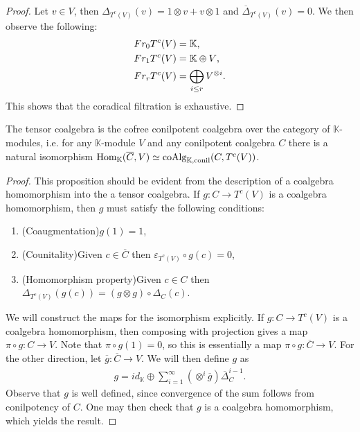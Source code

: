 \documentclass[../thesis.tex]{subfiles}
\begin{document}
            \begin{proof}
                Let $v\in V$, then $\Delta_{T^c(V)}(v)=1\otimes v + v\otimes 1$ and $\overline{\Delta}_{T^c(V)}(v)=0$. We then observe the following:
                \begin{align*}
                    Fr_0T^c(V) & = \mathbb{K}\tt{,} \\
                    Fr_1T^c(V) & = \mathbb{K} \oplus V\tt{,} \\
                    Fr_rT^c(V) & = \bigoplus_{i\leq r} V^{\otimes i}\tt{.}
                \end{align*}
                This shows that the coradical filtration is exhaustive.
            \end{proof}

            \begin{proposition}\label{prop: cofree-tensor}
                The tensor coalgebra is the cofree conilpotent coalgebra over the category of $\mathbb{K}$-modules, i.e. for any $\mathbb{K}$-module $V$ and any conilpotent coalgebra $C$ there is a natural isomorphism $\tt{Hom}_{\mathbb{K}}(\overline{C}, V)\simeq \tt{coAlg}_{\mathbb{K},\tt{conil}}(C, T^c(V))$.
            \end{proposition}

            \begin{proof}
                This proposition should be evident from the description of a coalgebra homomorphism into the a tensor coalgebra. If $g:C\rightarrow T^c(V)$ is a coalgebra homomorphism, then $g$ must satisfy the following conditions:
                \begin{enumerate}
                    \item (Coaugmentation)\quad $g(1)=1$,
                    \item (Counitality)\quad Given $c\in \overline{C}$ then $\varepsilon_{T^c(V)}\circ g(c)=0$,
                    \item (Homomorphism property)\quad Given $c\in C$ then $\Delta_{T^c(V)}(g(c))=(g\otimes g)\circ\Delta_C(c)$.
                \end{enumerate}

                We will construct the maps for the isomorphism explicitly. If $g:C\rightarrow T^c(V)$ is a coalgebra homomorphism, then composing with projection gives a map $\pi\circ g:C\rightarrow V$. Note that $\pi\circ g(1)=0$, so this is essentially a map $\pi\circ g:\overline{C}\rightarrow V$. For the other direction, let $\overline{g}:\overline{C}\rightarrow V$. We will then define $g$ as
                \begin{align*}
                    g = id_{\mathbb{K}} \oplus \sum_{i=1}^{\infty}(\otimes^{i}\overline{g})\overline{\Delta}_C^{i-1}.
                \end{align*}
                Observe that $g$ is well defined, since convergence of the sum follows from conilpotency of $C$. One may then check that $g$ is a coalgebra homomorphism, which yields the result.
            \end{proof}
\end{document}
